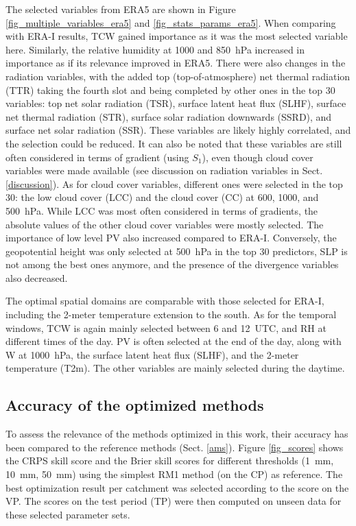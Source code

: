 \documentclass[draft]{agujournal2019}
\begin{document}
The selected variables from ERA5 are shown in Figure \ref{fig_multiple_variables_era5} and \ref{fig_stats_params_era5}. When comparing with ERA-I results, TCW gained importance as it was the most selected variable here. Similarly, the relative humidity at 1000 and 850~hPa increased in importance as if its relevance improved in ERA5. There were also changes in the radiation variables, with the added top (top-of-atmosphere) net thermal radiation (TTR) taking the fourth slot and being completed by other ones in the top 30 variables: top net solar radiation (TSR), surface latent heat flux (SLHF), surface net thermal radiation (STR), surface solar radiation downwards (SSRD), and surface net solar radiation (SSR). These variables are likely highly correlated, and the selection could be reduced. It can also be noted that these variables are still often considered in terms of gradient (using $S_{1}$), even though cloud cover variables were made available (see discussion on radiation variables in Sect. \ref{discussion}). As for cloud cover variables, different ones were selected in the top 30: the low cloud cover (LCC) and the cloud cover (CC) at 600, 1000, and 500~hPa. While LCC was most often considered in terms of gradients, the absolute values of the other cloud cover variables were mostly selected. The importance of low level PV also increased compared to ERA-I. Conversely, the geopotential height was only selected at 500~hPa in the top 30 predictors, SLP is not among the best ones anymore, and the presence of the divergence variables also decreased.

The optimal spatial domains are comparable with those selected for ERA-I, including the 2-meter temperature extension to the south. As for the temporal windows, TCW is again mainly selected between 6 and 12~UTC, and RH at different times of the day. PV is often selected at the end of the day, along with W at 1000~hPa, the surface latent heat flux (SLHF), and the 2-meter temperature (T2m). The other variables are mainly selected during the daytime.


\subsection{Accuracy of the optimized methods}
\label{skill_score}

To assess the relevance of the methods optimized in this work, their accuracy has been compared to the reference methods (Sect. \ref{ams}). Figure \ref{fig_scores} shows the CRPS skill score and the Brier skill scores for different thresholds (1~mm, 10~mm, 50~mm) using the simplest RM1 method (on the CP) as reference. The best optimization result per catchment was selected according to the score on the VP. The scores on the test period (TP) were then computed on unseen data for these selected parameter sets.
\end{document}
